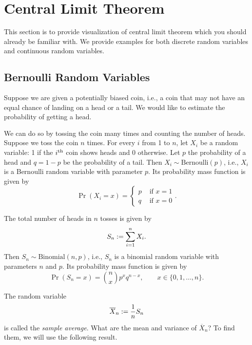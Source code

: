 \documentclass[12pt]{article}
\newcommand*{\Xbar}{\overline{X}}
\begin{document}
\newpage

\section{Central Limit Theorem}

This section is to provide visualization of central limit theorem which you should already be familiar with.
We provide examples for both discrete random variables and continuous random variables.

\subsection{Bernoulli Random Variables}
\label{sec:bernoulli}

Suppose we are given a potentially biased coin, i.e.,
a coin that may not have an equal chance of landing on a head or a tail.
We would like to estimate the probability of getting a head.

We can do so by tossing the coin many times and counting the number of heads.
Suppose we toss the coin $n$ times. For every $i$ from 1 to $n$, let $X_i$ be a random variable:
1 if the $i^{\textrm{th}}$ coin shows heads and 0 otherwise.
Let $p$ the probability of a head and $q=1-p$ be the probability of a tail.
Then $X_i \sim \mathrm{Bernoulli}(p)$, i.e., $X_i$ is a Bernoulli random variable with parameter $p$.
Its probability mass function is given by
\[ \Pr(X_i = x) = \begin{cases}p & \text{ if } x = 1 \\ q & \text{ if } x = 0\end{cases}. \]

The total number of heads in $n$ tosses is given by
\[ S_n := \sum_{i=1}^n X_i. \]
Then $S_n \sim \mathrm{Binomial}(n, p)$, i.e., $S_n$ is a binomial random variable
with parameters $n$ and $p$. Its probability mass function is given by
\[ \Pr(S_n = x) = \binom{n}{x}p^xq^{n-x}, \qquad x \in \{0, 1, \ldots, n\}. \]

The random variable
\[ \Xbar_n \defeq \frac{1}{n}S_n \]
is called the \emph{sample average}.
What are the mean and variance of $\Xbar_n$?
To find them, we will use the following result.

\begin{tcolorbox}[myres]
\end{tcolorbox}
\end{document}
